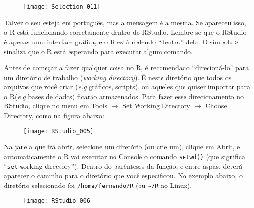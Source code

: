 \documentclass[a4paper,12pt]{article}\usepackage{graphicx, color}
\providecommand{\eg}{\textit{e.g}\xspace}
\providecommand{\R}{\textsf{R}\xspace}
\providecommand{\RStudio}{\textsf{RStudio}\xspace}
\begin{document}
%
%
%
%
%

\begin{figure}[H]
  \centering
  \texttt{[image: Selection\_011]}
\end{figure}

Talvez o seu esteja em português, mas a mensagem é a mesma. Se apareceu
isso, o \R está funcionando corretamente dentro do
\RStudio. Lembre-se que o \RStudio é apenas uma interface
gráfica, e o \R está rodendo ``dentro'' dela.  O símbolo \texttt{>}
sinaliza que o \R está esperando para executar algum comando.

Antes de começar a fazer qualquer coisa no \R, é recomendado
``direcioná-lo'' para um diretório de trabalho (\textit{working
  directory}). É neste diretório que todos os arquivos que você criar
(\eg gráficos, scripts), ou aqueles que quiser importar para o \R (\eg
bases de dados) ficarão armazenados. Para fazer esse direcionamento no
\RStudio, clique no menu em \textsf{Tools $\rightarrow$ Set Working
  Directory $\rightarrow$ Choose Directory}, como na figura abaixo:

\begin{figure}[H]
  \centering
  \texttt{[image: RStudio\_005]}
\end{figure}
Na janela que irá abrir, selecione um diretório (ou crie um), clique em
\textsf{Abrir}, e automaticamente o \R vai executar no \textsf{Console}
o comando \texttt{setwd()} (que significa ``\texttt{set} \texttt{w}orking
\texttt{d}irectory''). Dentro do parênteses da função, e entre aspas,
deverá aparecer o caminho para o diretório que você especificou. No
exemplo abaixo, o diretório selecionado foi \texttt{/home/fernando/R}
(ou \verb|~/R| no Linux).

\begin{figure}[H]
  \centering
  \texttt{[image: RStudio\_006]}
\end{figure}
\end{document}
